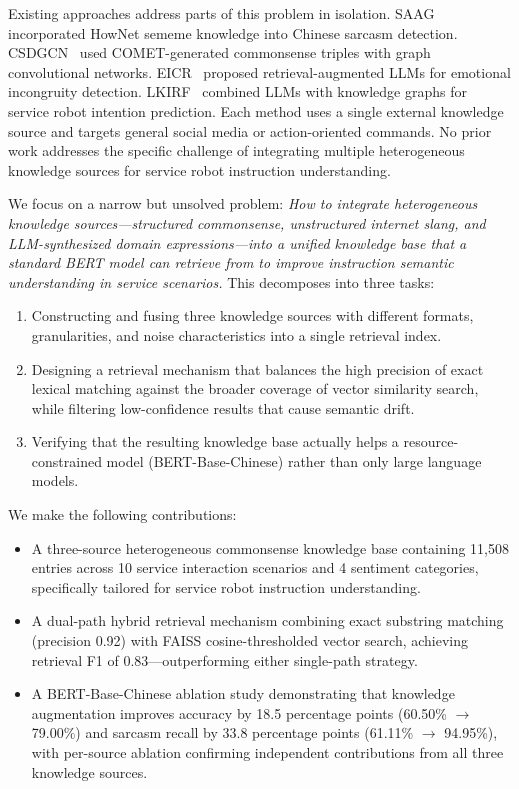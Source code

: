 \documentclass[conference]{IEEEtran}
\begin{document}
Existing approaches address parts of this problem in isolation. SAAG~\cite{saag2022}
incorporated HowNet sememe knowledge into Chinese sarcasm detection.
CSDGCN~\cite{csdgcn2023} used COMET-generated commonsense triples with graph
convolutional networks. EICR~\cite{eicr2024} proposed retrieval-augmented LLMs
for emotional incongruity detection. LKIRF~\cite{lkirf2024} combined LLMs with
knowledge graphs for service robot intention prediction.
Each method uses a single external knowledge source and targets general social media
or action-oriented commands. No prior work addresses the specific challenge of
integrating multiple heterogeneous knowledge sources for service robot instruction
understanding.

We focus on a narrow but unsolved problem: \textit{How to integrate heterogeneous
knowledge sources—structured commonsense, unstructured internet slang, and
LLM-synthesized domain expressions—into a unified knowledge base that a standard
BERT model can retrieve from to improve instruction semantic understanding in
service scenarios.} This decomposes into three tasks:

\begin{enumerate}[leftmargin=*]
    \item Constructing and fusing three knowledge sources with different formats,
    granularities, and noise characteristics into a single retrieval index.
    \item Designing a retrieval mechanism that balances the high precision of exact
    lexical matching against the broader coverage of vector similarity search,
    while filtering low-confidence results that cause semantic drift.
    \item Verifying that the resulting knowledge base actually helps a
    resource-constrained model (BERT-Base-Chinese) rather than only large language models.
\end{enumerate}

We make the following contributions:
\begin{itemize}[leftmargin=*]
    \item A three-source heterogeneous commonsense knowledge base containing 11,508
    entries across 10 service interaction scenarios and 4 sentiment categories,
    specifically tailored for service robot instruction understanding.
    \item A dual-path hybrid retrieval mechanism combining exact substring matching
    (precision 0.92) with FAISS cosine-thresholded vector search, achieving retrieval
    F1 of 0.83—outperforming either single-path strategy.
    \item A BERT-Base-Chinese ablation study demonstrating that knowledge
    augmentation improves accuracy by 18.5 percentage points (60.50\% $\rightarrow$
    79.00\%) and sarcasm recall by 33.8 percentage points (61.11\% $\rightarrow$
    94.95\%), with per-source ablation confirming independent contributions
    from all three knowledge sources.
\end{itemize}
\end{document}
